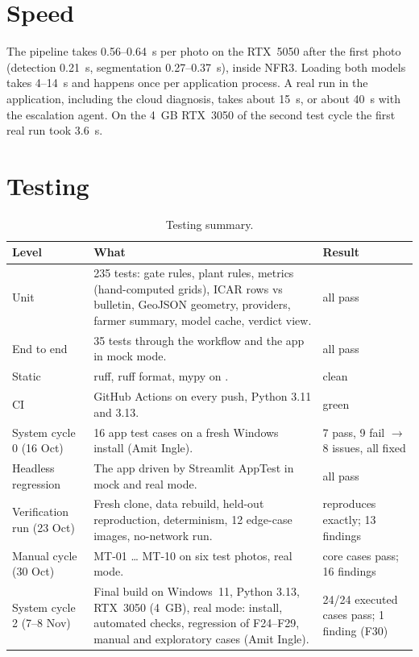 \section{Speed}\label{sec:speed}
The pipeline takes 0.56--0.64~s per photo on the RTX~5050 after the first photo (detection 0.21~s,
segmentation 0.27--0.37~s), inside NFR3. Loading both models takes 4--14~s and happens once per
application process. A real run in the application, including the cloud diagnosis, takes about 15~s,
or about 40~s with the escalation agent. On the 4~GB RTX~3050 of the second test cycle the first real
run took 3.6~s.

\section{Testing}\label{sec:testing}
\begin{table}[H]
\centering
\caption{Testing summary.}\label{tab:testing}
\begin{small}
\begin{tabularx}{\textwidth}{@{}L{3.2cm}YL{3.0cm}@{}}
\toprule
\textbf{Level} & \textbf{What} & \textbf{Result}\\
\midrule
Unit & 235 tests: gate rules, plant rules, metrics (hand-computed grids), ICAR rows vs bulletin, GeoJSON geometry, providers, farmer summary, model cache, verdict view. & all pass\\
End to end & 35 tests through the workflow and the app in mock mode. & all pass\\
Static & ruff, ruff format, mypy on . & clean\\
CI & GitHub Actions on every push, Python 3.11 and 3.13. & green\\
System cycle 0 (16 Oct) & 16 app test cases on a fresh Windows install (Amit Ingle). & 7 pass, 9 fail $\rightarrow$ 8 issues, all fixed\\
Headless regression & The app driven by Streamlit AppTest in mock and real mode. & all pass\\
Verification run (23 Oct) & Fresh clone, data rebuild, held-out reproduction, determinism, 12 edge-case images, no-network run. & reproduces exactly; 13 findings\\
Manual cycle (30 Oct) & MT-01 \ldots{} MT-10 on six test photos, real mode. & core cases pass; 16 findings\\
System cycle 2 (7--8 Nov) & Final build on Windows~11, Python 3.13, RTX~3050 (4~GB), real mode: install, automated checks, regression of F24--F29, manual and exploratory cases (Amit Ingle). & 24/24 executed cases pass; 1 finding (F30)\\
\bottomrule
\end{tabularx}
\end{small}
\end{table}

